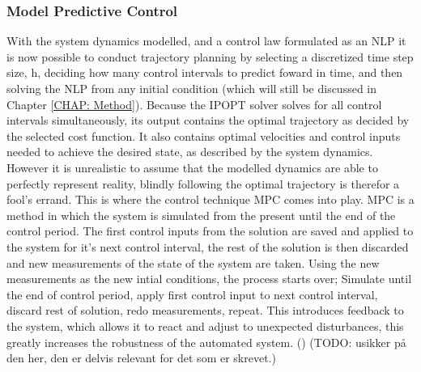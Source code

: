 \subsubsection*{Model Predictive Control}
With the system dynamics modelled, and a control law formulated as an \gls{NLP} it is now possible to conduct trajectory planning by
selecting a discretized time step size, h, deciding how many control intervals to predict foward in time, and then solving the NLP from any initial condition
(which will still be discussed in Chapter \ref{CHAP: Method}). Because the \gls{IPOPT} solver
solves for all control intervals simultaneously, its output contains the optimal trajectory as decided by the selected cost function. It also contains optimal
velocities and control inputs needed to achieve the desired state, as described by the system dynamics. However it is unrealistic to assume that the
modelled dynamics are able to perfectly represent reality, blindly following the optimal trajectory is therefor a fool's errand. This is where the
control technique \gls{MPC} comes into play. \gls{MPC} is a method in which the system is simulated from the present until the end of the control
period. The first control inputs from the solution are saved and applied to the system for it's next control interval, the rest of the solution is then
discarded and new measurements of the state of the system are taken. Using the new measurements as the new intial conditions, the process starts over;
Simulate until the end of control period, apply first control input to next control interval, discard rest of solution, redo measurements, repeat.
This introduces feedback to the system, which allows it to react and adjust to unexpected disturbances, this greatly increases the robustness of the automated system.
(\cite{qin1997overview}) (TODO: usikker på den her, den er delvis relevant for det som er skrevet.)





